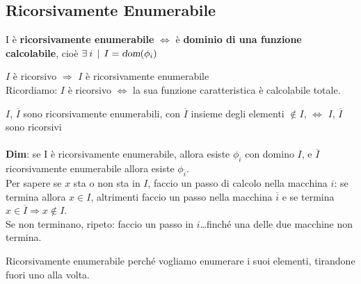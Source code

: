 \documentclass[10pt]{book}
\begin{document}
\subsection{Ricorsivamente Enumerabile}
I è \textbf{ricorsivamente enumerabile} $\Leftrightarrow$ è \textbf{dominio di una funzione calcolabile}, cioè $\exists\: i\:\:|\:\: I = \textsl{dom}(\phi_i)$
\begin{list}{}{}
	\item $I$ è ricorsivo $\Rightarrow$ $I$ è ricorsivamente enumerabile\\
Ricordiamo: $I$ è ricorsivo $\Leftrightarrow$ la sua funzione caratteristica è calcolabile totale.
	\item $I$, $\overline{I}$ sono ricorsivamente enumerabili, con $\overline{I}$ insieme degli elementi $\not\in I$, $\Leftrightarrow$ $I$, $\overline{I}$ sono ricorsivi\\\\
	\textbf{Dim}: se I è ricorsivamente enumerabile, allora esiste $\phi_i$ con domino $I$, e $\overline{I}$ ricorsivamente enumerabile allora esiste $\phi_{\overline{i}}$.\\
	Per sapere se $x$ sta o non sta in $I$, faccio un passo di calcolo nella macchina $i$: se termina allora $x \in I$, altrimenti faccio un passo nella macchina $\overline{i}$ e se termina $x \in \overline{I} \Rightarrow x \not\in I$.\\
	Se non terminano, ripeto: faccio un passo in $i$\ldots finché una delle due macchine non termina.
\end{list}
Ricorsivamente enumerabile perché vogliamo enumerare i suoi elementi, tirandone fuori uno alla volta.
\end{document}
